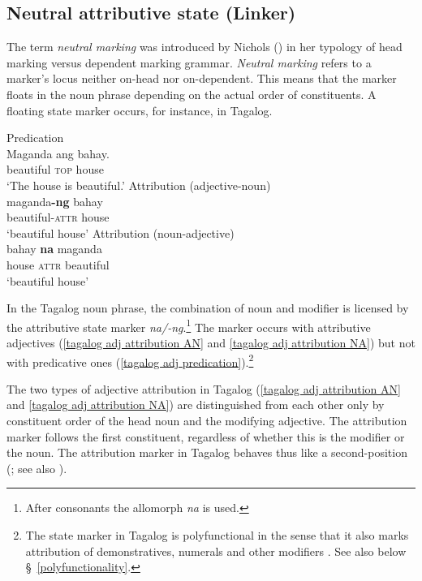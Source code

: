 \subsection[Neutral attributive state]{Neutral attributive state (Linker)} \label{linker}
The term \emph{neutral marking} was introduced by Nichols (\citeyear{nichols1986}) in her typology of head marking versus dependent marking grammar. \emph{Neutral marking} refers to a marker's locus neither on-head nor on-dependent. This means that the marker floats in the noun phrase depending on the actual order of constituents. A floating state marker occurs, for instance, in Tagalog.
\begin{exe} 
\ex 
{} \label{tagalog linker}
\begin{xlist}
\ex 	\rm{Predication}\\
\gll Maganda ang bahay.\\
	beautiful \textsc{top} house\\
\glt	‘The house is beautiful.’\label{tagalog adj predication}
\ex	\rm{Attribution (adjective-noun)}\\
\gll maganda\textbf{-ng} bahay\\
	beautiful-\textsc{attr} house\\
\glt	‘beautiful house’\label{tagalog adj attribution AN}
\ex	\rm{Attribution (noun-adjective)}\\
\gll bahay \textbf{na} maganda\\
	house \textsc{attr} beautiful\\
\glt	‘beautiful house’ \label{tagalog adj attribution NA}
\end{xlist}
\end{exe}
In the Tagalog noun phrase, the combination of noun and modifier is licens\-ed by the attributive state marker \textit{na/-ng}.\footnote{After consonants the allomorph \textit{na} is used.} The marker occurs with attributive adjectives (\ref{tagalog adj attribution AN} and \ref{tagalog adj attribution NA}) but not with predicative ones (\ref{tagalog adj predication}).\footnote{The state marker in Tagalog is polyfunctional in the sense that it also marks attribution of demonstratives, numerals and other modifiers \cite[160–161]{himmelmann1997}. See also below \S~\ref{polyfunctionality}.}

The two types of adjective attribution in Tagalog (\ref{tagalog adj attribution AN} and \ref{tagalog adj attribution NA}) are distinguished from each other only by constituent order of the head noun and the modifying adjective. The attribution marker follows the first constituent, regardless of whether this is the modifier or the noun. The attribution marker in Tagalog behaves thus like a second-position  (\citealt[65]{nichols1986}; see also \citealt[160, 162]{himmelmann1997}).

